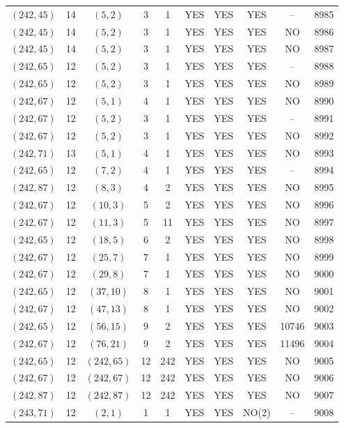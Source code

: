 \begin{longtable}{|c|c|c|c|c|c|c|c|c|c|}
$(242, 45)$ & 14 & $(5, 2)$ & 3 & 1 & YES & YES & YES & -- & 8985\\
$(242, 45)$ & 14 & $(5, 2)$ & 3 & 1 & YES & YES & YES & NO & 8986\\
$(242, 45)$ & 14 & $(5, 2)$ & 3 & 1 & YES & YES & YES & NO & 8987\\
$(242, 65)$ & 12 & $(5, 2)$ & 3 & 1 & YES & YES & YES & -- & 8988\\
$(242, 65)$ & 12 & $(5, 2)$ & 3 & 1 & YES & YES & YES & NO & 8989\\
$(242, 67)$ & 12 & $(5, 1)$ & 4 & 1 & YES & YES & YES & NO & 8990\\
$(242, 67)$ & 12 & $(5, 2)$ & 3 & 1 & YES & YES & YES & -- & 8991\\
$(242, 67)$ & 12 & $(5, 2)$ & 3 & 1 & YES & YES & YES & NO & 8992\\
$(242, 71)$ & 13 & $(5, 1)$ & 4 & 1 & YES & YES & YES & NO & 8993\\
$(242, 65)$ & 12 & $(7, 2)$ & 4 & 1 & YES & YES & YES & -- & 8994\\
$(242, 87)$ & 12 & $(8, 3)$ & 4 & 2 & YES & YES & YES & NO & 8995\\
$(242, 67)$ & 12 & $(10, 3)$ & 5 & 2 & YES & YES & YES & NO & 8996\\
$(242, 67)$ & 12 & $(11, 3)$ & 5 & 11 & YES & YES & YES & NO & 8997\\
$(242, 65)$ & 12 & $(18, 5)$ & 6 & 2 & YES & YES & YES & NO & 8998\\
$(242, 67)$ & 12 & $(25, 7)$ & 7 & 1 & YES & YES & YES & NO & 8999\\
$(242, 67)$ & 12 & $(29, 8)$ & 7 & 1 & YES & YES & YES & NO & 9000\\
$(242, 65)$ & 12 & $(37, 10)$ & 8 & 1 & YES & YES & YES & NO & 9001\\
$(242, 67)$ & 12 & $(47, 13)$ & 8 & 1 & YES & YES & YES & NO & 9002\\
$(242, 65)$ & 12 & $(56, 15)$ & 9 & 2 & YES & YES & YES & 10746 & 9003\\
$(242, 67)$ & 12 & $(76, 21)$ & 9 & 2 & YES & YES & YES & 11496 & 9004\\
$(242, 65)$ & 12 & $(242, 65)$ & 12 & 242 & YES & YES & YES & NO & 9005\\
$(242, 67)$ & 12 & $(242, 67)$ & 12 & 242 & YES & YES & YES & NO & 9006\\
$(242, 87)$ & 12 & $(242, 87)$ & 12 & 242 & YES & YES & YES & NO & 9007\\
$(243, 71)$ & 12 & $(2, 1)$ & 1 & 1 & YES & YES & NO(2) & -- & 9008\\

\end{longtable}
